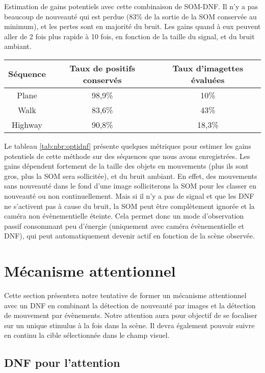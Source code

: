 	\begin{tableth}
	\caption[Gains grâce à la combinaison SOM-DNF]{Estimation de gains potentiels avec cette combinaison de SOM-DNF. Il n'y a pas beaucoup de nouveauté qui est perdue (83\% de la sortie de la SOM conservée au minimum), et les pertes sont en majorité du bruit. Les gains quand à eux peuvent aller de 2 fois plus rapide à 10 fois, en fonction de la taille du signal, et du bruit ambiant.}
	\begin{tabular}{|c|c|c|}
		\hline
		Séquence & Taux de positifs conservés & Taux d'imagettes évaluées\\
		\hline
		Plane & 98,9\% & 10\% \\
		Walk & 83,6\% & 43\% \\
		Highway & 90,8\% & 18,3\% \\
		\hline
	\end{tabular}
	\label{tab:nbr:optidnf}
	\end{tableth}

	Le tableau \ref{tab:nbr:optidnf} présente quelques métriques pour estimer les gains potentiels de cette méthode sur des séquences que nous avons enregistrées. Les gains dépendent fortement de la taille des objets en mouvements (plus ils sont gros, plus la SOM sera sollicitée), et du bruit ambiant. En effet, des mouvements sans nouveauté dans le fond d'une image solliciterons la SOM pour les classer en nouveauté ou non continuellement. Mais si il n'y a pas de signal et que les DNF ne s'activent pas à cause du bruit, la SOM peut être complètement ignorée et la caméra non évènementielle éteinte. Cela permet donc un mode d'observation passif consommant peu d'énergie (uniquement avec caméra évènementielle et DNF), qui peut automatiquement devenir actif en fonction de la scène observée.

	\newpage

	\section{Mécanisme attentionnel}

	Cette section présentera notre tentative de former un mécanisme attentionnel avec un DNF en combinant la détection de nouveauté par images et la détection de mouvement par évènements. Notre attention aura pour objectif de se focaliser sur un unique stimulus à la fois dans la scène. Il devra également pouvoir suivre en continu la cible sélectionnée dans le champ visuel.

	\subsection{DNF pour l'attention}

